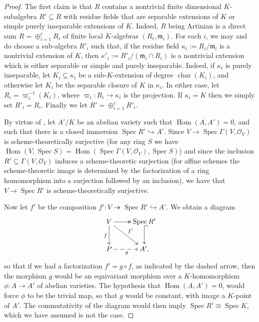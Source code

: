 \documentclass[11pt, reqno]{amsart}
\numberwithin{equation}{section}
\theoremstyle{definition}
\theoremstyle{remark}
\begin{document}
\begin{proof} The first claim is that $R$ contains a nontrivial finite dimensional  $K$-subalgebra $R'\subseteq R$ with residue fields that are separable extensions of $K$ or simple purely inseparable extensions of $K$.  Indeed,  $R$  being Artinian is a direct sum $R = \oplus_{i=1}^c
  R_i$ of finite local $K$-algebras $(R_i, \mathfrak m_i)$.  For each
  $i$, we may and do choose a sub-algebra $R'_i$ such that, if the
  residue field $\kappa_i:= R_i/\mathfrak m_i$ is a nontrivial
  extension of $K$, then $\kappa'_i := R'_i/(\mathfrak m_i\cap R_i)$ is
  a nontrivial extension which is either separable or simple and
  purely inseparable.  Indeed, if $\kappa_i$ is purely inseparable,
  let $K_i \subseteq \kappa_i$ be a sub-$K$-extension of degree
  $\operatorname{char}(K_i)$, and otherwise let $K_i$ be the separable
  closure of $K$ in $\kappa_i$.  In either case, let $R_i =
  \varpi_i^{-1}(K_i)$, where $\varpi_i:R_i \to \kappa_i$ is the
  projection.  If $\kappa_i = K$ then we simply set $R'_i = R_i$.  
  Finally we let $R' = \oplus_{i=1}^c R'_i$.  
    
  By virtue of , let $A'/K$ be an abelian variety such that $\operatorname{Hom}(A,A')=
  0$,  and such that there is a closed immersion $\operatorname{Spec}R'\hookrightarrow A'$. 
Since $V\to \operatorname{Spec}\Gamma(V,\mathcal O_V)$ is
scheme-theoretically surjective (for any ring $S$ we have
$\operatorname{Hom}(V,\operatorname{Spec}
S)=\operatorname{Hom}(\operatorname{Spec}\Gamma(V,\mathcal
O_V),\operatorname{Spec} S)$) and since the inclusion $R'\subseteq
\Gamma(V,\mathcal O_V)$ induces a scheme-theoretic surjection (for
affine schemes the scheme-theoretic image is determined by the
factorization of a ring homomorphism into a surjection followed by an
inclusion), we have that $V\to \operatorname{Spec}R'$ is
scheme-theoretically surjective.
   
  
Now let  $f'$  be the composition $f':V\twoheadrightarrow
\operatorname{Spec}R' \hookrightarrow A'$. We obtain a diagram
  \begin{equation}
    \label{E:impossfact}
  \xymatrix{
    V \ar[dr]^{f'} \ar[d]_f \ar@{->>}[r]^{} & \operatorname{Spec}R'\ar@{^{(}->}[d] \\
    P \ar@{-->}[r]_{g} & A',
  }
  \end{equation}
so that if we had a 
  factorization $f' = g \circ f$, as indicated by the dashed arrow, 
  then the  morphism $g$ would be an equivariant morphism over a $K$-homomorphism $\phi:A
  \to A'$ of abelian varieties.  The hypothesis that $\operatorname{Hom}(A,A')=0$, would force $\phi$ to  be the trivial
  map, so that $g$ would be constant, with image a $K$-point of $A'$.
  The commutativity of the diagram would then imply
  $\operatorname{Spec}R'\cong \operatorname{Spec}K$, which we have
  assumed is not the case.
\end{proof}
\end{document}
